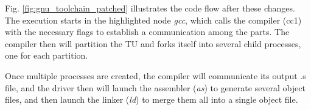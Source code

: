 \documentclass[runningheads]{llncs}
\begin{document}
Fig. \ref{fig:gnu_toolchain_patched} illustrates the code flow after these
changes.  The execution starts in the highlighted node \textit{gcc}, which
calls the compiler (cc1) with the necessary flags to establish a communication among
the parts. The compiler then will partition the TU and forks
itself into several child processes, one for each partition.

Once multiple processes are created, the compiler will communicate its output
.s file, and the driver then will launch the assembler (\textit{as}) to
generate several object files, and then launch the linker (\textit{ld}) to
merge them all into a single object file.

\end{document}
